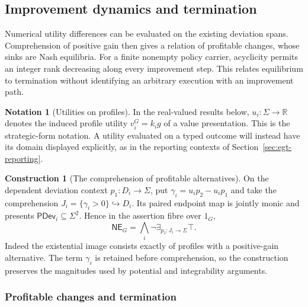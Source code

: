 \documentclass[11pt,a4paper]{article}
\numberwithin{equation}{section}
\theoremstyle{definition}
\newtheorem{construction}[construction]{Construction}
\newtheorem{notation}[theorem]{Notation}
\theoremstyle{remark}
\theoremstyle{plain}
\begin{document}
\subsection{Improvement dynamics and termination}
\label{sec:egt-improvement}

Numerical utility differences can be evaluated on the existing
deviation spans. Comprehension of positive gain then gives a relation
of profitable changes, whose sinks are Nash equilibria. For a finite
nonempty policy carrier, acyclicity permits an integer rank decreasing
along every improvement step. This relates equilibrium to termination
without identifying an arbitrary execution with an improvement path.

\begin{notation}[Utilities on profiles]
In the real-valued results below, $u_i:\Sigma\to\mathbb R$ denotes the
induced profile utility $v_i^G=k_i g$ of a value presentation. This is the
strategic-form notation. A utility evaluated on a typed outcome will
instead have its domain displayed explicitly, as in the reporting
contexts of Section~\ref{sec:egt-reporting}.
\end{notation}

\begin{construction}[The comprehension of profitable alternatives]
\label{con:fib-profitable-comprehension}
On the dependent deviation context $p_1:D_i\to\Sigma$, put
$\gamma_i=u_ip_2-u_ip_1$ and take the comprehension
$J_i=\{\gamma_i>0\}\hookrightarrow D_i$. Its paired endpoint map
is jointly monic and presents $\mathsf{PDev}_i\subseteq\Sigma^2$.
Hence in the assertion fibre over $1_G$,
\[
 \mathsf{NE}_G
 =\bigwedge_i\neg\exists_{p_1:J_i\to\Sigma}\top.
\]
Indeed the existential image consists exactly of profiles with a
positive-gain alternative. The term $\gamma_i$ is retained before
comprehension, so the construction preserves the magnitudes used by
potential and integrability arguments.
\end{construction}

\subsubsection{Profitable changes and termination}
\end{document}
